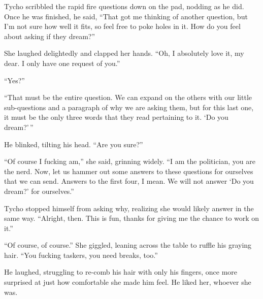 Tycho scribbled the rapid fire questions down on the pad, nodding as he did. Once he was finished, he said, ``That got me thinking of another question, but I'm not sure how well it fits, so feel free to poke holes in it. How do you feel about asking if they dream?''

She laughed delightedly and clapped her hands. ``Oh, I absolutely love it, my dear. I only have one request of you.''

``Yes?''

``That must be the entire question. We can expand on the others with our little sub-questions and a paragraph of why we are asking them, but for this last one, it must be the only three words that they read pertaining to it. `Do you dream?'\,''

He blinked, tilting his head. ``Are you sure?''

``Of course I fucking am,'' she said, grinning widely. ``I am the politician, you are the nerd. Now, let us hammer out some answers to these questions for ourselves that we can send. Answers to the first four, I mean. We will not answer `Do you dream?' for ourselves.''

Tycho stopped himself from asking why, realizing she would likely answer in the same way. ``Alright, then. This is fun, thanks for giving me the chance to work on it.''

``Of course, of course.'' She giggled, leaning across the table to ruffle his graying hair. ``You fucking taskers, you need breaks, too.''

He laughed, struggling to re-comb his hair with only his fingers, once more surprised at just how comfortable she made him feel. He liked her, whoever she was.
